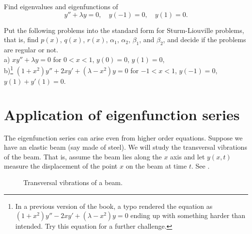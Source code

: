 \documentclass[12pt]{book}
\begin{document}
\setcounter{exercise}{100}

\begin{exercise}
Find eigenvalues and eigenfunctions of
\begin{equation*}
y'' + \lambda y = 0, \quad y(-1) = 0, \quad y(1) = 0 .
\end{equation*}
\end{exercise}

\begin{exercise}
Put the following problems into the standard form for Sturm-Liouville
problems, that is, find $p(x)$, $q(x)$, $r(x)$,
$\alpha_1$,
$\alpha_2$,
$\beta_1$, and
$\beta_2$,
and decide if the problems are regular or not.\\
a) $x y'' + \lambda y = 0$ for $0 < x < 1$, $y(0) = 0$, $y(1) = 0$,\\
b)\footnote{In a previous version of the book, a typo rendered the equation
as $(1+x^2) y'' - 2xy' + (\lambda-x^2) y = 0$ ending up with something
harder than intended.  Try this equation for a further challenge.}
$(1+x^2) y'' + 2xy' + (\lambda-x^2) y = 0$ for $-1 < x < 1$, $y(-1) = 0$, $y(1)+y'(1) =
0$.
\end{exercise}


\sectionnewpage
\section{Application of eigenfunction series}
\label{sec:appeig}


The eigenfunction series can arise even from higher order equations.
Suppose we have an elastic beam (say made of steel).  We will study the
transversal vibrations of the beam.  That is, assume the beam lies along
the $x$ axis and let $y(x,t)$ measure the displacement of the point $x$
on the beam at time $t$.  See .

\begin{figure}[h!t]
\capstart
\begin{center}
\caption{Transversal vibrations of a beam.\label{appeig:transbeamfig}}
\end{center}
\end{figure}
\end{document}
